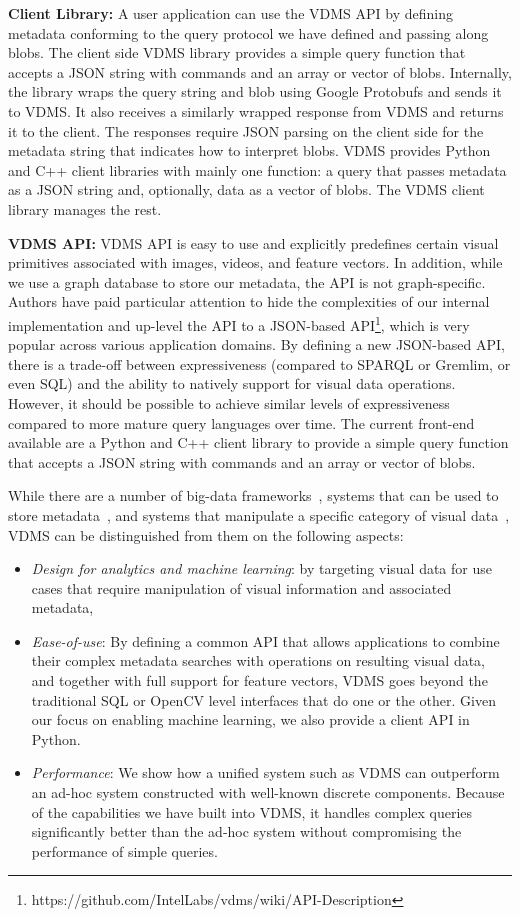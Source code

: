 \textbf{Client Library:}
A user application can use the VDMS API by defining metadata conforming to the
query protocol we have defined and passing along blobs. The client side VDMS
library provides a simple query function that accepts a JSON string with
commands and an array or vector of blobs.
Internally, the library wraps the query string and blob using
Google Protobufs \cite{protobufs} and sends it to VDMS.
It also receives a similarly wrapped response from VDMS
and returns it to the client. The responses require JSON parsing on the client
side for the metadata string that indicates how to interpret blobs.
VDMS provides Python and C++ client libraries with mainly
one function: a query that passes metadata as a JSON string and,
optionally, data as a vector of blobs. The VDMS client library manages the
rest.

\textbf{VDMS API:}
VDMS API is easy to use and explicitly predefines certain
visual primitives associated with images, videos, and feature vectors. In
addition, while we use a graph database to store our metadata, the API is not
graph-specific.
Authors have paid particular attention to hide the complexities of our internal
implementation and up-level the API to a JSON-based
API\footnote{https://github.com/IntelLabs/vdms/wiki/API-Description},
which is very popular across various application domains.
By defining a new JSON-based API, there is a trade-off between
expressiveness (compared to SPARQL or Gremlim, or even SQL) and
the ability to natively support for visual data operations.
However, it should be possible to achieve similar levels of
expressiveness compared to more mature query languages over time.
The current front-end available are a Python and C++ client
library to provide a simple query function that accepts a JSON string with
commands and an array or vector of blobs.

While there are a number of big-data frameworks~\cite{spark, hadoop}, systems
that can be used to store metadata~\cite{memsql, vertica}, and systems that
manipulate a specific category of visual data~\cite{scidb, rasdaman}, VDMS can
be distinguished from them on the following aspects:

\begin{itemize}
\item {\em Design for analytics and machine learning}: by targeting
visual data for use cases that require manipulation
of visual information and associated metadata,
\item {\em Ease-of-use}: By defining a common API that allows applications to
combine their complex metadata searches with operations on resulting visual
data, and together with full support for feature vectors, VDMS goes beyond the
traditional SQL or OpenCV level interfaces that do one or the other. Given our
focus on enabling machine learning, we also provide a client API in Python.
\item {\em Performance}: We show how a unified system such as VDMS can
outperform an ad-hoc system constructed with well-known discrete components.
Because of the capabilities we have built into VDMS, it handles complex
queries significantly better than the ad-hoc system without compromising the
performance of simple queries.
\end{itemize}
